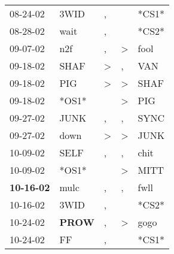 \begin{supertabular}{p{0.07\textwidth}p{0.06\textwidth}p{0.02\textwidth}p{0.02\textwidth}p{0.06\textwidth}}
          08-24-02\textsuperscript{} &           3WID\textsuperscript{} &                , &                  &                            *CS1* \\
          08-28-02\textsuperscript{} &           wait\textsuperscript{} &                , &                  &                            *CS2* \\
          09-07-02\textsuperscript{} &            n2f\textsuperscript{} &                , &     \textgreater &           fool\textsuperscript{} \\
          09-18-02\textsuperscript{} &           SHAF\textsuperscript{} &     \textgreater &                , &            VAN\textsuperscript{} \\
          09-18-02\textsuperscript{} &            PIG\textsuperscript{} &     \textgreater &     \textgreater &           SHAF\textsuperscript{} \\
          09-18-02\textsuperscript{} &                            *OS1* &                  &     \textgreater &            PIG\textsuperscript{} \\
          09-27-02\textsuperscript{} &           JUNK\textsuperscript{} &                , &                , &           SYNC\textsuperscript{} \\
          09-27-02\textsuperscript{} &           down\textsuperscript{} &     \textgreater &     \textgreater &           JUNK\textsuperscript{} \\
          10-09-02\textsuperscript{} &           SELF\textsuperscript{} &                , &                , &           chit\textsuperscript{} \\
          10-09-02\textsuperscript{} &                            *OS1* &                  &     \textgreater &           MITT\textsuperscript{} \\
 \textbf{10-16-02\textsuperscript{}} &           mulc\textsuperscript{} &                , &                , &           fwll\textsuperscript{} \\
          10-16-02\textsuperscript{} &           3WID\textsuperscript{} &                , &                  &                            *CS2* \\
          10-24-02\textsuperscript{} &  \textbf{PROW\textsuperscript{}} &                , &     \textgreater &           gogo\textsuperscript{} \\
          10-24-02\textsuperscript{} &             FF\textsuperscript{} &                , &                  &                            *CS1* \\

\end{supertabular}
